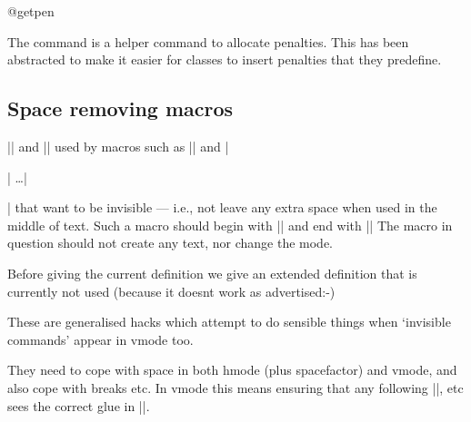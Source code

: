  
\begin{docCommand}{@getpen}{}
\end{docCommand}
The command  is a helper command to allocate penalties. This has
been abstracted to make it easier for classes to insert penalties that
they predefine.
\begin{teX}
\def\@getpen#1{\ifcase #1 \z@ \or \@lowpenalty\or
         \@medpenalty \or \@highpenalty (*@\label{getpen}@*)
         \else \@M \fi}
\end{teX}




    \begin{teX}
\def\@nobreakfalse{\global\let\if@nobreak\iffalse}
\def\@nobreaktrue {\global\let\if@nobreak\iftrue}
\@nobreakfalse
    \end{teX}

%
\subsection{Space removing macros}
  |\@bsphack| and |\@esphack|
   used by macros such as |\index| and
  |\begin{@float}| \ldots |\end{@float}|
  that want to be invisible --- i.e.,
  not leave any extra space when used in the middle of text.  Such
  a macro should begin with |\@bsphack| and end with |\@esphack|
  The macro in question should not create any text, nor change the
  mode.

 Before giving the current definition we give an extended definition
 that is currently not used (because it doesnt work as advertised:-)

    These are generalised hacks which attempt to do sensible things
    when `invisible commands' appear in vmode too.

    They need to cope with space in both hmode (plus spacefactor) and
    vmode, and also cope with breaks etc.  In vmode this means
    ensuring that any following |\addvspace|, etc sees the correct
    glue in |\lastskip|.

